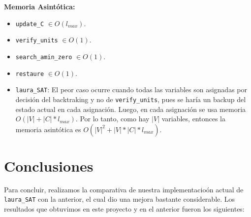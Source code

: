 \documentclass[letterpaper,12pt]{article}
\begin{document}
\textbf{Memoria Asintótica:} 
\begin{itemize}
	\item \texttt{update\_C} $\in O(l_{max})$.

	\item \texttt{verify\_units} $\in O(1)$.
	
	\item \texttt{search\_amin\_zero} $\in O(1)$.
	
	\item \texttt{restaure} $\in O(1)$.

	\item \texttt{laura\_SAT}: El peor caso ocurre cuando todas las variables son asignadas por decisi\'on del backtraking y no de \texttt{verify\_units}, pues se har\'ia un backup del estado actual en cada asignaci\'on. Luego, en cada asignaci\'on se usa memoria  $O(|V| + |C|*l_{max})$. Por lo tanto, como hay $|V|$ variables, entonces la memoria asint\'otica es $O(|V|^2 + |V|*|C|*l_{max})$.
\end{itemize}

\section{Conclusiones}

Para concluir, realizamos la comparativa de nuestra implementacio\'on actual de \texttt{laura\_SAT} con la anterior, el cual dio una mejora bastante considerable. Los resultados que obtuvimos en este proyecto y en el anterior fueron los siguientes:
\end{document}
